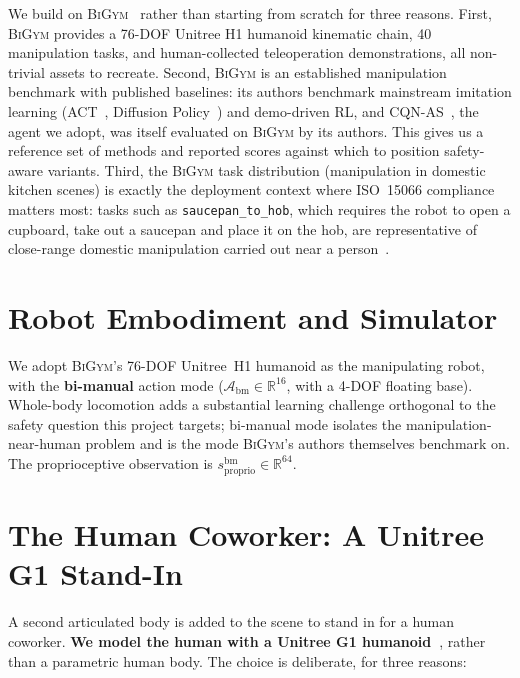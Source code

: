\documentclass[11pt,a4paper]{report}
\newcommand{\iso}{ISO~15066}
\newcommand{\bigym}{\textsc{BiGym}}
\newcommand{\cqnas}{CQN-AS}
\begin{document}
We build on \bigym{}~\cite{chernyadev2024bigym} rather than
starting from scratch for three reasons. First, \bigym{} provides
a 76-DOF Unitree H1 humanoid kinematic chain, 40 manipulation
tasks, and human-collected teleoperation demonstrations, all
non-trivial assets to recreate. Second, \bigym{} is an established
manipulation benchmark with published baselines: its authors
benchmark mainstream imitation learning (ACT~\cite{zhao2023act},
Diffusion Policy~\cite{chi2023diffusion}) and demo-driven RL, and
\cqnas{}~\cite{seo2024cqnas}, the agent we adopt, was itself
evaluated on \bigym{} by its authors. This gives us a reference set
of methods and reported scores against which to position
safety-aware variants. Third, the \bigym{} task distribution
(manipulation in domestic kitchen scenes) is exactly the deployment
context where \iso{} compliance matters most: tasks such as
\texttt{saucepan\_to\_hob}, which requires the robot to open a
cupboard, take out a saucepan and place it on the hob, are
representative of close-range domestic manipulation carried out near
a person~\cite{chernyadev2024bigym}.

\section{Robot Embodiment and Simulator}
\label{sec:bench:embodiment}

We adopt \bigym{}'s 76-DOF Unitree~H1 humanoid as the manipulating
robot, with the \textbf{bi-manual} action mode ($\mathcal{A}_{\mathrm{bm}}
\in \mathbb{R}^{16}$, with a 4-DOF floating base). Whole-body
locomotion adds a substantial learning challenge orthogonal to the
safety question this project targets; bi-manual mode isolates the
manipulation-near-human problem and is the mode \bigym{}'s authors
themselves benchmark on. The proprioceptive observation is
$s_{\mathrm{proprio}}^{\mathrm{bm}} \in \mathbb{R}^{64}$.

\section{The Human Coworker: A Unitree G1 Stand-In}
\label{sec:bench:human}

A second articulated body is added to the scene to stand in for a
human coworker. \textbf{We model the human with a Unitree G1
humanoid~\cite{unitree_g1}}, rather than a parametric human body.
The choice is deliberate, for three reasons:
\end{document}
